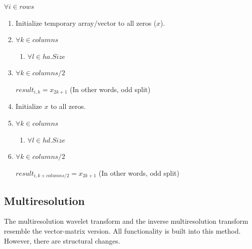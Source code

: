 $\forall i \in rows$
\begin{enumerate}
\item Initialize temporary array/vector to all zeros ($x$).
\item $\forall k \in columns $
\begin{enumerate}
\item $\forall l \in ha.Size$

\end{enumerate}
\item $\forall k \in columns/2 $

$result_{i,k} = x_{2k+1} $  (In other words, odd split)

\item Initialize $x$ to all zeros.
\item $\forall k \in columns $
\begin{enumerate}
\item $\forall l \in hd.Size $



\end{enumerate}


\item $\forall k \in columns/2 $

$result_{i,k+columns/2} = x_{2k+1} $  (In other words, odd split)


\end{enumerate}

\subsection {Multiresolution}

The multiresolution wavelet transform and the inverse multiresolution transform resemble the vector-matrix version.  All functionality is built into this method.  However, there are structural changes.

